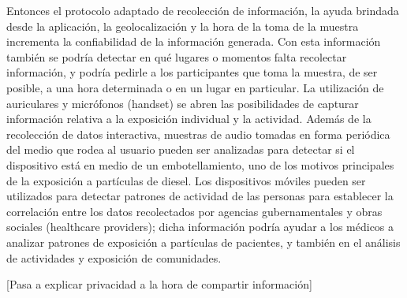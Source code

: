 	Entonces el protocolo adaptado de recolección de información, la ayuda brindada desde la aplicación, la geolocalización y la hora de la toma de la muestra incrementa la confiabilidad de la información generada. Con esta información también se podría detectar en qué lugares o momentos falta recolectar información, y podría pedirle a los participantes que toma la muestra, de ser posible, a una hora determinada o en un lugar en particular. La utilización de auriculares y micrófonos (handset) se abren las posibilidades de capturar información relativa a la exposición individual y la actividad. Además de la recolección de datos interactiva, muestras de audio tomadas en forma periódica del medio que rodea al usuario pueden ser analizadas para detectar si el dispositivo está en medio de un embotellamiento, uno de los motivos principales de la exposición a partículas de diesel. Los dispositivos móviles pueden ser utilizados para detectar patrones de actividad de las personas para establecer la correlación entre los datos recolectados por agencias gubernamentales y obras sociales (healthcare providers); dicha información podría ayudar a los médicos a analizar patrones de exposición a partículas de pacientes, y también en el análisis de actividades y exposición de comunidades. 
	
	[Pasa a explicar privacidad a la hora de compartir información]
